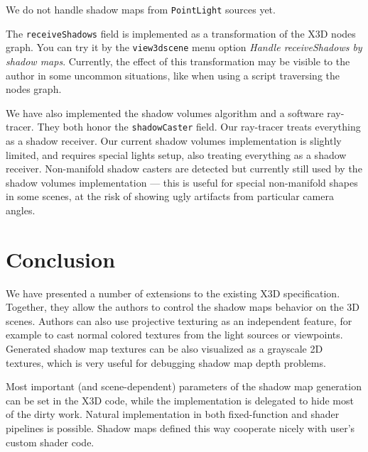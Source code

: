 \documentclass{acmsiggraph}                     %
\begin{document}

We do not handle shadow maps from \texttt{PointLight} sources yet.

The \texttt{receiveShadows} field is implemented
as a transformation of the X3D nodes graph.
You can try it by the \texttt{view3dscene} menu option
\textit{Handle receiveShadows by shadow maps}.
Currently, the effect of this transformation
may be visible to the author in some uncommon situations,
like when using a script traversing the nodes graph.


We have also implemented the shadow volumes algorithm \cite{vrmleng:shadowvolumes}
and a software ray-tracer.
They both honor the \texttt{shadowCaster} field.
Our ray-tracer treats everything as a shadow receiver.
Our current shadow volumes implementation is slightly limited,
and requires special lights setup,
also treating everything as a shadow receiver.
Non-manifold shadow casters are detected but currently still
used by the shadow volumes implementation --- this is useful for special
non-manifold shapes in some scenes,
at the risk of showing ugly artifacts from particular camera angles.

\section{Conclusion}

We have presented a number of extensions to the existing X3D specification.
Together, they allow the authors to control the shadow maps
behavior on the 3D scenes.
Authors can also use projective texturing
as an independent feature, for example to cast normal colored textures
from the light sources or viewpoints. Generated shadow map textures can be also
visualized as a grayscale 2D textures, which is very useful for debugging
shadow map depth problems.

Most important (and scene-dependent) parameters
of the shadow map generation can be set in the X3D code, while the implementation
is delegated to hide most of the dirty work. Natural implementation
in both fixed-function and shader pipelines is possible. Shadow maps
defined this way cooperate nicely with user's custom shader code.
\end{document}
